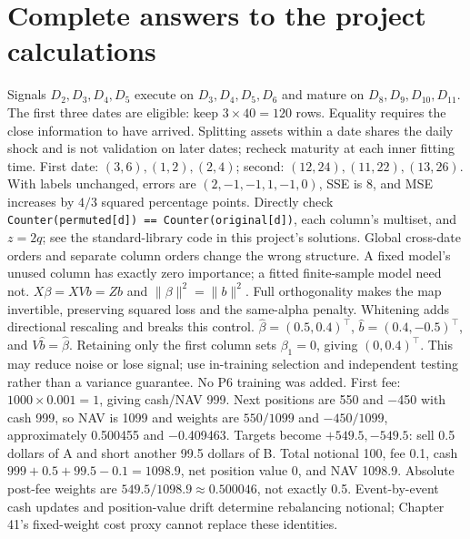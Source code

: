 \clearpage\section*{Complete answers to the project calculations}
Signals $D_2,D_3,D_4,D_5$ execute on $D_3,D_4,D_5,D_6$ and mature on $D_8,D_9,D_{10},D_{11}$. The first three dates are eligible: keep $3\times40=120$ rows. Equality requires the close information to have arrived. Splitting assets within a date shares the daily shock and is not validation on later dates; recheck maturity at each inner fitting time.
First date: $(3,6),(1,2),(2,4)$; second: $(12,24),(11,22),(13,26)$. With labels unchanged, errors are $(2,-1,-1,1,-1,0)$, SSE is 8, and MSE increases by $4/3$ squared percentage points. Directly check \texttt{Counter(permuted[d]) == Counter(original[d])}, each column's multiset, and $z=2q $; see the standard-library code in this project's solutions. Global cross-date orders and separate column orders change the wrong structure. A fixed model's unused column has exactly zero importance; a fitted finite-sample model need not.
\clearpage
{}
$X\beta=XVb=Zb $ and $\|\beta\|^2=\|b\|^2$. Full orthogonality makes the map invertible, preserving squared loss and the same-alpha penalty. Whitening adds directional rescaling and breaks this control. $\hat\beta=(0.5,0.4)^\top $, $\hat b=(0.4,-0.5)^\top $, and $V\hat b=\hat\beta $. Retaining only the first column sets $\beta_1=0$, giving $(0,0.4)^\top $. This may reduce noise or lose signal; use in-training selection and independent testing rather than a variance guarantee. No P6 training was added.
First fee: $1000\times0.001=1$, giving cash/NAV 999. Next positions are 550 and −450 with cash 999, so NAV is 1099 and weights are $550/1099$ and $-450/1099$, approximately 0.500455 and −0.409463. Targets become $+549.5,-549.5$: sell 0.5 dollars of A and short another 99.5 dollars of B. Total notional 100, fee 0.1, cash $999+0.5+99.5-0.1=1098.9$, net position value 0, and NAV 1098.9. Absolute post-fee weights are $549.5/1098.9\approx0.500046$, not exactly 0.5. Event-by-event cash updates and position-value drift determine rebalancing notional; Chapter 41's fixed-weight cost proxy cannot replace these identities.
